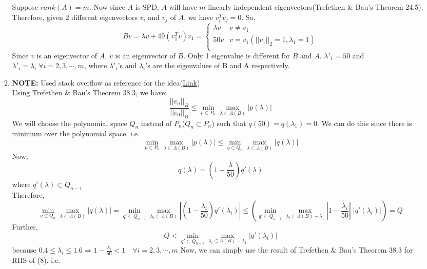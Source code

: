 \documentclass{article}
\begin{document}
\begin{enumerate}
\begin{enumerate}[label=(\alph*)]
        Suppose $rank(A) = m$. Now since $A$ is SPD, $A$ will have $m$ linearly independent eigenvectors(Trefethen \& Bau's Theorem 24.5).\\
        Therefore, given 2 different eigenvectors $v_i$ and $v_j$ of $A$, we have $v_i^Tv_j = 0$. So,
        $$Bv = \lambda v + 49(v_1^Tv)v_1 = \begin{cases}
            \lambda v & v \neq v_1\\
            50v & v = v_1(||v_1||_2 = 1, \lambda_1 = 1)\\
        \end{cases}$$
        Since $v$ is an eigenvector of $A$, $v$ is an eigenvector of $B$. Only 1 eigenvalue is different for $B$ and $A$. $\lambda'_1 = 50$ and $\lambda'_i = \lambda_i \; \forall i = 2, 3, \cdots, m$, where $\lambda'_i$'s and $\lambda_i$'s are the eigenvalues of B and A respectively.
    \item \textbf{NOTE:} Used stack overflow as reference for the idea(\href{https://math.stackexchange.com/questions/1554314/improved-error-estimate-for-conjugate-gradient-method?rq=1}{Link})\\
    Using Trefethen \& Bau's Theorem 38.3, we have:
    $$\frac{||e_n||_B}{||e_0||_B} \leq \min_{p \subset P_n}\max_{\lambda \subset \Lambda(B)}|p(\lambda)|$$
    We will choose the polynomial space $Q_n$ instead of $P_n$($Q_n \subset P_n$) such that $q(50) = q(\lambda_1) = 0$. We can do this since there is minimum over the polynomial space. i.e.
    $$\min_{p \subset P_n}\max_{\lambda \subset \Lambda(B)}|p(\lambda)| \leq \min_{q \subset Q_n}\max_{\lambda \subset \Lambda(B)}|q(\lambda)|$$
    \clearpage
    Now,
    $$q(\lambda) = (1 - \frac{\lambda}{50})q'(\lambda)$$
    where $q'(\lambda) \subset Q_{n - 1}$\\
    Therefore,
    $$\min_{q \subset Q_n}\max_{\lambda \subset \Lambda(B)}|q(\lambda)| = \min_{q' \subset Q_{n - 1}}\max_{\lambda_i \subset \Lambda(B)}|(1 - \frac{\lambda_i}{50})q'(\lambda_i)| \leq (\min_{q' \subset Q_{n - 1}}\max_{\lambda_i \subset \Lambda(B) - \lambda_1}|1 - \frac{\lambda_i}{50}|\;|q'(\lambda_i)|) = Q$$
    Further,
    \begin{equation}
    Q < \min_{q' \subset Q_{n - 1}}\max_{\lambda_i \subset \Lambda(B) - \lambda_1}|q'(\lambda_i)|
    \end{equation}
    because $0.4 \leq \lambda_i \leq 1.6 \Rightarrow 1 - \frac{\lambda_i}{50} < 1 \quad \forall i = 2, 3, \cdots, m$
    Now, we can simply use the result of Trefethen \& Bau's Theorem 38.3 for RHS of (8). i.e.

\end{enumerate}
\end{enumerate}
\end{document}
